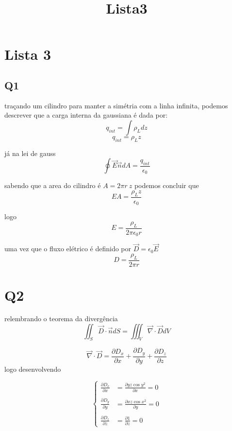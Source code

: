 \documentclass[11pt]{article}
\title{Lista3}
\begin{document}
    
    \maketitle
    
    

    
    \hypertarget{lista-3}{%
\section{Lista 3}\label{lista-3}}

\hypertarget{q1}{%
\subsection{Q1}\label{q1}}

    traçando um cilindro para manter a simétria com a linha infinita,
podemos descrever que a carga interna da gaussiana é dada por:
\[ q_{int} = \int \rho_L dz \] \[ q_{int} = \rho_L z \]

já na lei de gauss
\[ \oint \vec{E} \vec{n} dA = \frac{q_{int}}{\epsilon_0} \]

sabendo que a area do cilindro é $A = 2\pi r ~z $ podemos concluir que
$$ EA = \frac{\rho_L z}{\epsilon_0} $$

logo \[ E = \frac{\rho_L }{2\pi\epsilon_0 r } \]

uma vez que o fluxo elétrico é definido por
\(\vec{D} = \epsilon_0 \vec{E}\) \[ D = \frac{\rho_L}{2\pi r}\]

    \hypertarget{q2}{%
\section{Q2}\label{q2}}

    relembrando o teorema da divergência
\[\iint_S \vec{D} \cdot \vec{n} dS = \iiint_V \vec{\nabla} \cdot \vec{D} dV \]

    \[ \vec{\nabla} \cdot \vec{D} = \frac{\partial D_x}{\partial x}+\frac{\partial D_y}{\partial y}+\frac{\partial D_z}{\partial z}\]
logo desenvolvendo

$$    \begin{cases}
\displaystyle \frac{\partial D_x}{\partial x} &= \displaystyle \frac{\partial yz\cos{y^2}}{\partial x} = 0 \\ \\ 
\displaystyle\frac{\partial D_y}{\partial y} &= \displaystyle\frac{\partial xz\cos{x^2}}{\partial y} = 0 \\ \\ 
\displaystyle\frac{\partial D_z}{\partial z} &= \displaystyle\frac{\partial 1}{\partial z} = 0
\end{cases}$$
\end{document}
